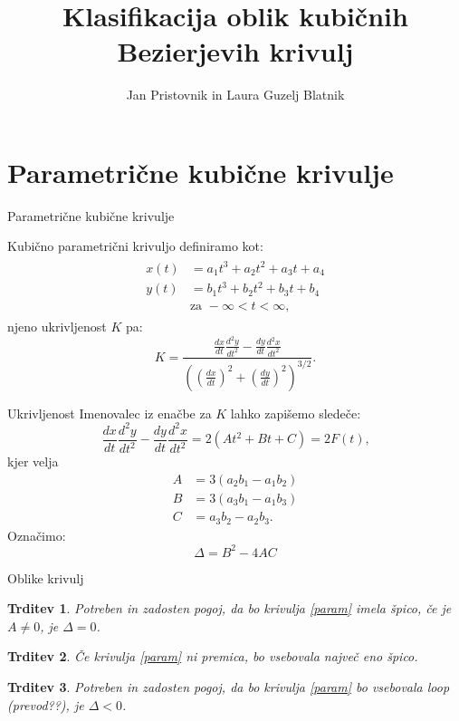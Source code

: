 \documentclass{beamer} %
\title{Klasifikacija oblik kubičnih Bezierjevih krivulj}
\author{Jan Pristovnik in Laura Guzelj Blatnik}
\institute{Fakulteta za matematiko in fiziko}
\date{\displaydate{date}}
\newtheorem{trditev}{Trditev}
\begin{document}
 
\frame{\titlepage} %
 
\section{Parametrične kubične krivulje} 
\begin{frame} {Parametrične kubične krivulje}

Kubično parametrični krivuljo definiramo kot:
	\begin{align}
	\begin{split}
	x(t) &= a_1t^3+a_2t^2+a_3t+a_4 \\
	y(t) &= b_1t^3+b_2t^2+b_3t+b_4 \\
	&\text {za } -\infty < t < \infty \text{,}
	\label{param}
	\end{split}
	\end{align}
	njeno ukrivljenost $K$ pa:
	\[K = \frac{\frac{dx}{dt}\frac{d^2y}{dt^2} - \frac{dy}{dt}\frac{d^2x}{dt^2}}{\left((\frac{dx}{dt})^{2} +(\frac{dy}{dt})^2\right)^{3/2}}\text{.}\]

\end{frame}


\begin{frame}{Ukrivljenost}
Imenovalec iz enačbe za $K$ lahko zapišemo sledeče:
\[\frac{dx}{dt}\frac{d^2y}{dt^2} - \frac{dy}{dt}\frac{d^2x}{dt^2} = 2(At^2 + Bt +C) = 2F(t) \text{,}\]
kjer velja
	\begin{align*}
	A &= 3(a_2b_1-a_1b_2)\\
	B &= 3(a_3b_1 -a_1b_3) \\
	C &= a_3b_2-a_2b_3 \text{.}
	\end{align*}
Označimo:
\[\Delta = B^2- 4AC\]
\end{frame}

\begin{frame}{Oblike krivulj}
	\begin{trditev}
		Potreben in zadosten pogoj, da bo krivulja \eqref{param} imela špico, če je $A \neq 0$, je $\Delta = 0$.
	\end{trditev}
	\begin{trditev}
		Če krivulja \eqref{param} ni premica, bo vsebovala največ eno špico.
	\end{trditev}
	\begin{trditev}
		Potreben in zadosten pogoj, da bo krivulja \eqref{param} bo vsebovala loop (prevod??), je $\Delta <0$.
	\end{trditev}
		
\end{frame}
\end{document}
